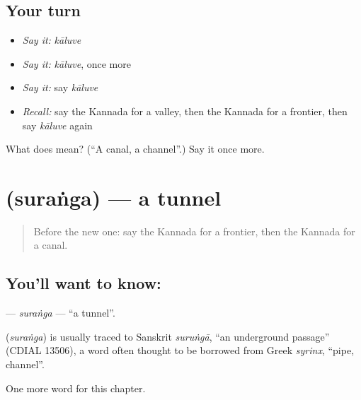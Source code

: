 \subsection*{Your turn}
\begin{itemize}
\raggedright
  \item \emph{Say it:} \emph{kāluve}
  \item \emph{Say it:} \emph{kāluve}, once more
  \item \emph{Say it:} say \emph{kāluve}
  \item \emph{Recall:} say the Kannada for a valley, then the Kannada for a frontier, then say \emph{kāluve} again
\end{itemize}

\begin{tcolorbox}[breakable,colback=teal!4,colframe=teal!35!black,title={Before you move on}]
What does  mean? (\textquotedblleft{}A canal, a channel\textquotedblright{}.) Say it once more.
\end{tcolorbox}
\section[\texorpdfstring{\kn{ಸುರಂಗ} (suraṅga)}{ಸುರಂಗ (suraṅga)}]{ (suraṅga) — a tunnel}

\label{lesson:KA-C251-suranga}



\begin{quote}
Before the new one: say the Kannada for a frontier, then the Kannada for a canal.
\end{quote}

\subsection*{You'll want to know: }
\textbf{} — \emph{suraṅga} — \textquotedblleft{}a tunnel\textquotedblright{}.

\begin{cousinweb}
\textbf{} (\emph{suraṅga}) is usually traced to Sanskrit \emph{suruṅgā}, \textquotedblleft{}an underground passage\textquotedblright{} (CDIAL 13506), a word often thought to be borrowed from Greek \emph{syrinx}, \textquotedblleft{}pipe, channel\textquotedblright{}.
\end{cousinweb}

\begin{grammarlens}[title={What you've built}]
One more word for this chapter.
\end{grammarlens}

